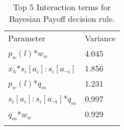 \begin{table}[H]
\caption{Top 5 Interaction terms for Bayesian Payoff decision rule. \label{tab:sa_interaction_payoff_sig}}
\begin{tabular} {ll}
\hline\noalign{\smallskip}
Parameter & Variance \\
\noalign{\smallskip}\svhline\noalign{\smallskip}
\(p_{w}(l)\)*\(w_{w}\) & 4.045\\
\(x_{h}\)*\(s_{i}[a_{i}]:s_{i}[a_{\neg i}]\) & 1.856\\
\(p_{w}(l)\)*\(q_{m}\) & 1.231\\
\(s_{i}[a_{i}]:s_{i}[a_{\neg i}]\)*\(q_{m}\) & 0.997\\
\(q_{m}\)*\(w_{w}\) & 0.929\\ 
\noalign{\smallskip}\hline\noalign{\smallskip}
\end{tabular}
\end{table}

